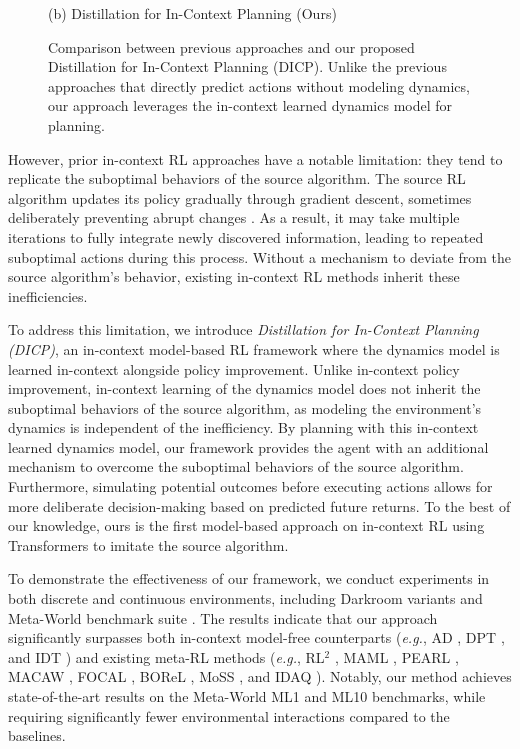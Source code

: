 \documentclass{article}
\begin{document}
\begin{figure}[t]
\begin{minipage}[b]{0.60\textwidth}
        \caption*{(b) Distillation for In-Context Planning (Ours)}
    \end{minipage}
    \caption{Comparison between previous approaches \citep{AD,DPT,IDT} and our proposed Distillation for In-Context Planning (DICP).
    Unlike the previous approaches that directly predict actions without modeling dynamics, our approach leverages the in-context learned dynamics model for planning.
    }
    \label{fig:main}
\end{figure}


However, prior in-context RL approaches have a notable limitation: they tend to replicate the suboptimal behaviors of the source algorithm.
The source RL algorithm updates its policy gradually through gradient descent, sometimes deliberately preventing abrupt changes \citep{TRPO,PPO}.
As a result, it may take multiple iterations to fully integrate newly discovered information, leading to repeated suboptimal actions during this process.
Without a mechanism to deviate from the source algorithm's behavior, existing in-context RL methods \citep{AD,IDT,Headless-AD} inherit these inefficiencies.

To address this limitation, we introduce \emph{Distillation for In-Context Planning (DICP)}, an in-context model-based RL framework where the dynamics model is learned in-context alongside policy improvement.
Unlike in-context policy improvement, in-context learning of the dynamics model does not inherit the suboptimal behaviors of the source algorithm, as modeling the environment's dynamics is independent of the inefficiency.
By planning with this in-context learned dynamics model, our framework provides the agent with an additional mechanism to overcome the suboptimal behaviors of the source algorithm.
Furthermore, simulating potential outcomes before executing actions allows for more deliberate decision-making based on predicted future returns.
To the best of our knowledge, ours is the first model-based approach on in-context RL using Transformers to imitate the source algorithm.

To demonstrate the effectiveness of our framework, we conduct experiments in both discrete and continuous environments, including Darkroom variants \citep{AD} and Meta-World benchmark suite \citep{MW}.
The results indicate that our approach significantly surpasses both in-context model-free counterparts (\textit{e.g.}, AD \citep{AD}, DPT \citep{DPT}, and IDT \citep{IDT}) and existing meta-RL methods (\textit{e.g.}, RL$^2$ \citep{RL2}, MAML \citep{MAML}, PEARL \citep{PEARL}, MACAW \citep{MACAW}, FOCAL \citep{FOCAL},  BOReL \citep{BOReL}, MoSS \citep{MoSS}, and IDAQ \citep{IDAQ}).
Notably, our method achieves state-of-the-art results on the Meta-World ML1 and ML10 benchmarks, while requiring significantly fewer environmental interactions compared to the baselines.
\end{document}
